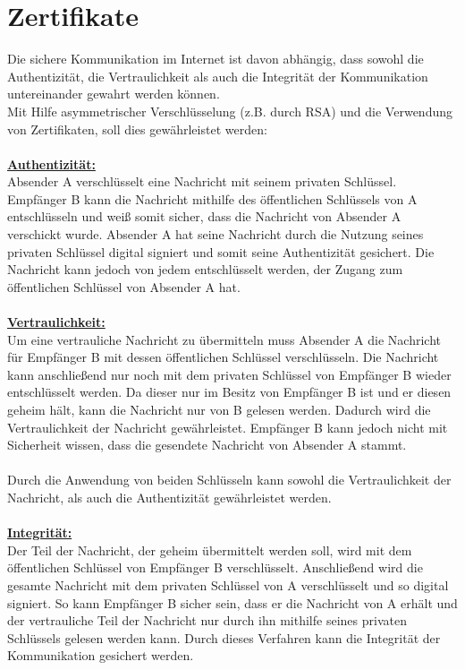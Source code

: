 \section{Zertifikate}
Die sichere Kommunikation im Internet ist davon abhängig, dass sowohl die Authentizität, die Vertraulichkeit als auch die Integrität der Kommunikation untereinander gewahrt werden können.\\
Mit Hilfe asymmetrischer Verschlüsselung (z.B. durch RSA) und die Verwendung von Zertifikaten, soll dies gewährleistet werden:\\
\\
\underline{\textbf{Authentizität:}}\\
Absender A verschlüsselt eine Nachricht mit seinem privaten Schlüssel. Empfänger B kann die Nachricht mithilfe des öffentlichen Schlüssels von A entschlüsseln und weiß somit sicher, dass die Nachricht von Absender A verschickt wurde. Absender A hat seine Nachricht durch die Nutzung seines privaten Schlüssel digital signiert und somit seine Authentizität gesichert. Die Nachricht kann jedoch von jedem entschlüsselt werden, der Zugang zum öffentlichen Schlüssel von Absender A hat.\\
\\
\underline{\textbf{Vertraulichkeit:}}\\
Um eine vertrauliche Nachricht zu übermitteln muss Absender A die Nachricht für Empfänger B mit dessen öffentlichen Schlüssel verschlüsseln. Die Nachricht kann anschließend nur noch mit dem privaten Schlüssel von Empfänger B wieder entschlüsselt werden. Da dieser nur im Besitz von Empfänger B ist und er diesen geheim hält, kann die Nachricht nur von B gelesen werden. Dadurch wird die Vertraulichkeit der Nachricht gewährleistet. Empfänger B kann jedoch nicht mit Sicherheit wissen, dass die gesendete Nachricht von Absender A stammt.\\
\\
Durch die Anwendung von beiden Schlüsseln kann sowohl die Vertraulichkeit der Nachricht, als auch die Authentizität gewährleistet werden.\\
\\
\underline{\textbf{Integrität:}}\\
Der Teil der Nachricht, der geheim übermittelt werden soll, wird mit dem öffentlichen Schlüssel von Empfänger B verschlüsselt. Anschließend wird die gesamte Nachricht mit dem privaten Schlüssel von A verschlüsselt und so digital signiert.
So kann Empfänger B sicher sein, dass er die Nachricht von A erhält und der vertrauliche Teil der Nachricht nur durch ihn mithilfe seines privaten Schlüssels gelesen werden kann. Durch dieses Verfahren kann die Integrität der Kommunikation gesichert werden.\\
